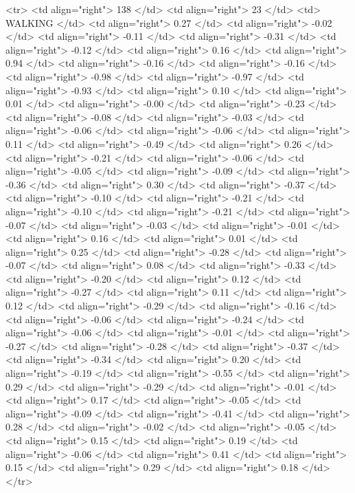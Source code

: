   <tr> <td align="right"> 138 </td> <td align="right">  23 </td> <td> WALKING </td> <td align="right"> 0.27 </td> <td align="right"> -0.02 </td> <td align="right"> -0.11 </td> <td align="right"> -0.31 </td> <td align="right"> -0.12 </td> <td align="right"> 0.16 </td> <td align="right"> 0.94 </td> <td align="right"> -0.16 </td> <td align="right"> -0.16 </td> <td align="right"> -0.98 </td> <td align="right"> -0.97 </td> <td align="right"> -0.93 </td> <td align="right"> 0.10 </td> <td align="right"> 0.01 </td> <td align="right"> -0.00 </td> <td align="right"> -0.23 </td> <td align="right"> -0.08 </td> <td align="right"> -0.03 </td> <td align="right"> -0.06 </td> <td align="right"> -0.06 </td> <td align="right"> 0.11 </td> <td align="right"> -0.49 </td> <td align="right"> 0.26 </td> <td align="right"> -0.21 </td> <td align="right"> -0.06 </td> <td align="right"> -0.05 </td> <td align="right"> -0.09 </td> <td align="right"> -0.36 </td> <td align="right"> 0.30 </td> <td align="right"> -0.37 </td> <td align="right"> -0.10 </td> <td align="right"> -0.21 </td> <td align="right"> -0.10 </td> <td align="right"> -0.21 </td> <td align="right"> -0.07 </td> <td align="right"> -0.03 </td> <td align="right"> -0.01 </td> <td align="right"> 0.16 </td> <td align="right"> 0.01 </td> <td align="right"> 0.25 </td> <td align="right"> -0.28 </td> <td align="right"> -0.07 </td> <td align="right"> 0.08 </td> <td align="right"> -0.33 </td> <td align="right"> -0.20 </td> <td align="right"> 0.12 </td> <td align="right"> -0.27 </td> <td align="right"> 0.11 </td> <td align="right"> 0.12 </td> <td align="right"> -0.29 </td> <td align="right"> -0.16 </td> <td align="right"> -0.06 </td> <td align="right"> -0.24 </td> <td align="right"> -0.06 </td> <td align="right"> -0.01 </td> <td align="right"> -0.27 </td> <td align="right"> -0.28 </td> <td align="right"> -0.37 </td> <td align="right"> -0.34 </td> <td align="right"> 0.20 </td> <td align="right"> -0.19 </td> <td align="right"> -0.55 </td> <td align="right"> 0.29 </td> <td align="right"> -0.29 </td> <td align="right"> -0.01 </td> <td align="right"> 0.17 </td> <td align="right"> -0.05 </td> <td align="right"> -0.09 </td> <td align="right"> -0.41 </td> <td align="right"> 0.28 </td> <td align="right"> -0.02 </td> <td align="right"> -0.05 </td> <td align="right"> 0.15 </td> <td align="right"> 0.19 </td> <td align="right"> -0.06 </td> <td align="right"> 0.41 </td> <td align="right"> 0.15 </td> <td align="right"> 0.29 </td> <td align="right"> 0.18 </td> </tr>
